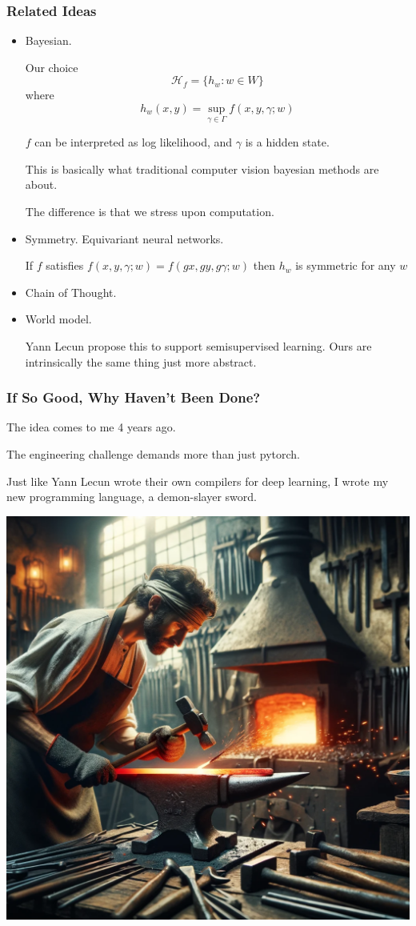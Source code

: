 \documentclass{beamer}   	%
\theoremstyle{definition}
\begin{document}
\begin{frame}
\frametitle{Related Ideas}
\begin{itemize}
	\item Bayesian.

	Our choice
	\begin{equation}
		\mathcal{H}_f=\{h_w: w\in W\}
	\end{equation}
	where
	\begin{equation}
		h_w(x,y)=\sup_{\gamma\in \Gamma} f(x,y,\gamma;w)
	\end{equation}

	$f$ can be interpreted as log likelihood, and $\gamma$ is a hidden state.

	This is basically what traditional computer vision bayesian methods are about.

	The difference is that we stress upon computation.
	\item Symmetry. Equivariant neural networks.

	If $f$ satisfies $f(x,y,\gamma;w)=f(gx,gy,g\gamma;w)$ then $h_w$ is symmetric for any $w$
	\item Chain of Thought.
	\item World model.

	Yann Lecun propose this to support semisupervised learning. Ours are intrinsically the same thing just more abstract.
\end{itemize}
\end{frame}

\begin{frame}
\frametitle{If So Good, Why Haven't Been Done?}
The idea comes to me 4 years ago.

The engineering challenge demands more than just pytorch.

Just like Yann Lecun wrote their own compilers for deep learning, I wrote my new programming language, a demon-slayer sword.

\begin{center}
\includegraphics[width=0.5\linewidth]{new_sword.png}
\end{center}
\end{frame}
\end{document}

